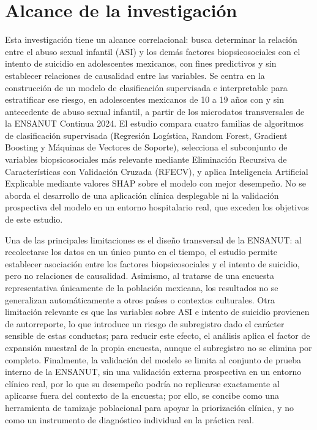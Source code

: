 \section{Alcance de la investigación}

Esta investigación tiene un alcance correlacional: busca determinar la relación entre el abuso sexual infantil (ASI) y los demás factores biopsicosociales con el intento de suicidio en adolescentes mexicanos, con fines predictivos y sin establecer relaciones de causalidad entre las variables. Se centra en la construcción de un modelo de clasificación supervisada e interpretable para estratificar ese riesgo, en adolescentes mexicanos de 10 a 19 años con y sin antecedente de abuso sexual infantil, a partir de los microdatos transversales de la ENSANUT Continua 2024. El estudio compara cuatro familias de algoritmos de clasificación supervisada (Regresión Logística, Random Forest, Gradient Boosting y Máquinas de Vectores de Soporte), selecciona el subconjunto de variables biopsicosociales más relevante mediante Eliminación Recursiva de Características con Validación Cruzada (RFECV), y aplica Inteligencia Artificial Explicable mediante valores SHAP sobre el modelo con mejor desempeño. No se aborda el desarrollo de una aplicación clínica desplegable ni la validación prospectiva del modelo en un entorno hospitalario real, que exceden los objetivos de este estudio.

Una de las principales limitaciones es el diseño transversal de la ENSANUT: al recolectarse los datos en un único punto en el tiempo, el estudio permite establecer asociación entre los factores biopsicosociales y el intento de suicidio, pero no relaciones de causalidad. Asimismo, al tratarse de una encuesta representativa únicamente de la población mexicana, los resultados no se generalizan automáticamente a otros países o contextos culturales. Otra limitación relevante es que las variables sobre ASI e intento de suicidio provienen de autorreporte, lo que introduce un riesgo de subregistro dado el carácter sensible de estas conductas; para reducir este efecto, el análisis aplica el factor de expansión muestral de la propia encuesta, aunque el subregistro no se elimina por completo. Finalmente, la validación del modelo se limita al conjunto de prueba interno de la ENSANUT, sin una validación externa prospectiva en un entorno clínico real, por lo que su desempeño podría no replicarse exactamente al aplicarse fuera del contexto de la encuesta; por ello, se concibe como una herramienta de tamizaje poblacional para apoyar la priorización clínica, y no como un instrumento de diagnóstico individual en la práctica real.

